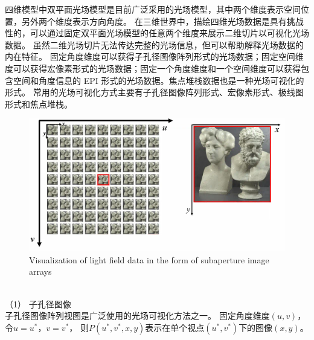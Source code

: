 %
%
%
%
%
四维模型中双平面光场模型是目前广泛采用的光场模型，其中两个维度表示空间位置，另外两个维度表示方向角度。
在三维世界中，描绘四维光场数据是具有挑战性的，可以通过固定双平面光场模型的任意两个维度来展示二维切片以可视化光场数据。
虽然二维光场切片无法传达完整的光场信息，但可以帮助解释光场数据的内在特征。
固定角度维度可以获得子孔径图像阵列形式的光场数据；固定空间维度可以获得宏像素形式的光场数据；固定一个角度维度和一个空间维度可以获得包含空间和角度信息的 EPI 形式的光场数据。焦点堆栈数据也是一种光场可视化的形式。
常用的光场可视化方式主要有子孔径图像阵列形式、宏像素形式、极线图形式和焦点堆栈。
\begin{figure}[b]
	\centering
	\includegraphics[width=0.80\linewidth]{figures/chapter2/multi_photo}
	{Visualization of light field data in the form of subaperture image arrays}  
	\label{chapter2_fig5:multi_photo}
\end{figure}
\\
%
%
%
%
\indent
（1）
子孔径图像
\\
%
%
%
%
\indent
子孔径图像阵列视图是广泛使用的光场可视化方法之一。
固定角度维度$(u, v)$，令$u = u^{*}$，$ v = v^{*} $，
则$P(u^{*}, v^{*}, x, y) $表示在单个视点$(u^{*}, v^{*})$下的图像$(x,y)$。
